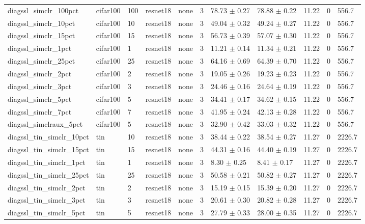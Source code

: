 \begin{tabular}{lllllllllll}
diagssl_simclr_100pct & cifar100 & 100 & resnet18 & none & 3 & 78.73 $\pm$ 0.27 & 78.88 $\pm$ 0.22 & 11.22 & 0 & 556.7 \\
diagssl_simclr_10pct & cifar100 & 10 & resnet18 & none & 3 & 49.04 $\pm$ 0.32 & 49.24 $\pm$ 0.27 & 11.22 & 0 & 556.7 \\
diagssl_simclr_15pct & cifar100 & 15 & resnet18 & none & 3 & 56.73 $\pm$ 0.39 & 57.07 $\pm$ 0.30 & 11.22 & 0 & 556.7 \\
diagssl_simclr_1pct & cifar100 & 1 & resnet18 & none & 3 & 11.21 $\pm$ 0.14 & 11.34 $\pm$ 0.21 & 11.22 & 0 & 556.7 \\
diagssl_simclr_25pct & cifar100 & 25 & resnet18 & none & 3 & 64.16 $\pm$ 0.69 & 64.39 $\pm$ 0.70 & 11.22 & 0 & 556.7 \\
diagssl_simclr_2pct & cifar100 & 2 & resnet18 & none & 3 & 19.05 $\pm$ 0.26 & 19.23 $\pm$ 0.23 & 11.22 & 0 & 556.7 \\
diagssl_simclr_3pct & cifar100 & 3 & resnet18 & none & 3 & 24.46 $\pm$ 0.16 & 24.64 $\pm$ 0.19 & 11.22 & 0 & 556.7 \\
diagssl_simclr_5pct & cifar100 & 5 & resnet18 & none & 3 & 34.41 $\pm$ 0.17 & 34.62 $\pm$ 0.15 & 11.22 & 0 & 556.7 \\
diagssl_simclr_7pct & cifar100 & 7 & resnet18 & none & 3 & 41.95 $\pm$ 0.24 & 42.13 $\pm$ 0.28 & 11.22 & 0 & 556.7 \\
diagssl_simclraux_5pct & cifar100 & 5 & resnet18 & none & 3 & 32.90 $\pm$ 0.42 & 33.03 $\pm$ 0.32 & 11.22 & 0 & 556.7 \\
diagssl_tin_simclr_10pct & tin & 10 & resnet18 & none & 3 & 38.44 $\pm$ 0.22 & 38.54 $\pm$ 0.27 & 11.27 & 0 & 2226.7 \\
diagssl_tin_simclr_15pct & tin & 15 & resnet18 & none & 3 & 44.31 $\pm$ 0.16 & 44.40 $\pm$ 0.19 & 11.27 & 0 & 2226.7 \\
diagssl_tin_simclr_1pct & tin & 1 & resnet18 & none & 3 & 8.30 $\pm$ 0.25 & 8.41 $\pm$ 0.17 & 11.27 & 0 & 2226.7 \\
diagssl_tin_simclr_25pct & tin & 25 & resnet18 & none & 3 & 50.58 $\pm$ 0.21 & 50.82 $\pm$ 0.27 & 11.27 & 0 & 2226.7 \\
diagssl_tin_simclr_2pct & tin & 2 & resnet18 & none & 3 & 15.19 $\pm$ 0.15 & 15.39 $\pm$ 0.20 & 11.27 & 0 & 2226.7 \\
diagssl_tin_simclr_3pct & tin & 3 & resnet18 & none & 3 & 20.61 $\pm$ 0.30 & 20.82 $\pm$ 0.28 & 11.27 & 0 & 2226.7 \\
diagssl_tin_simclr_5pct & tin & 5 & resnet18 & none & 3 & 27.79 $\pm$ 0.33 & 28.00 $\pm$ 0.35 & 11.27 & 0 & 2226.7 \\

\end{tabular}
